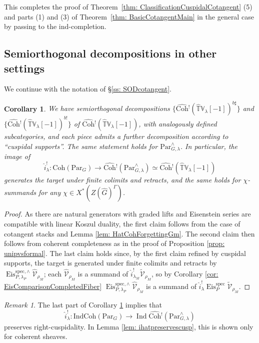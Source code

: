 \documentclass{amsart}
\newtheorem{corollary}[theorem]{Corollary}
\theoremstyle{definition}
\theoremstyle{remark}
\newtheorem{remark}[theorem]{Remark}
\numberwithin{equation}{section}
\DeclareMathOperator{\Ind}{Ind}
\newcommand{\mc}{\mathcal}
\newcommand{\spec}{\mathrm{spec}}
\newcommand{\wh}{\widehat}
\newcommand{\Par}{\mathrm{Par}}
\newcommand{\IndCoh}{\mathrm{IndCoh}}
\DeclareMathOperator{\Eis}{\mathrm{Eis}}
\newcommand{\Coh}{\mathrm{Coh}}
\newcommand{\V}{\mathbb{V}}
\newcommand{\T}{\mathbb{T}}
\begin{document}
This completes the proof of Theorem~\ref{thm: ClassificationCuspidalCotangent} (5) and parts (1) and (3) of Theorem~\ref{thm: BasicCotangentMain} in the general case by passing to the ind-completion.

\subsection{Semiorthogonal decompositions in other settings}

We continue with the notation of \S\ref{ss: SODcotangent}.

\begin{corollary}\label{cor: SODhatCoh}
We have semiorthogonal decompositions $\{\wh{\Coh}{}^!(\wh{\T}\V_{\lambda}[-1])^{b\sharp}\}$ and $\{\wh{\Coh}{}^!(\wh{\T}\V_{\lambda}[-1])^{b!}\}$ of $\wh{\Coh}{}^!(\wh{\T}\V_{\lambda}[-1])$, with analogously defined subcategories, and each piece admits a further decomposition according to ``cuspidal supports''. The same statement holds for $\Par_{G,\lambda}^{\wedge}$. In particular, the image of 
\[
\wh{i}_\lambda^!\colon \Coh(\Par_G) \to \wh{\Coh}{}^!(\Par_{G,\lambda}^\wedge) \simeq \wh{\Coh}{}^!(\wh{\T}\V_{\lambda}[-1])
\]
generates the target under finite colimits and retracts, and the same holds for $\chi$-summands for any $\chi \in X^*(Z(\wh G)^{\Gamma})$. 
\end{corollary}

\begin{proof}
As there are natural generators with graded lifts and Eisenstein series are compatible with linear Koszul duality, the first claim follows from the case of cotangent stacks and Lemma \ref{lem: HatCohForgettingGm}. The second claim then follows from coherent completeness as in the proof of Proposition \ref{prop: unipvsformal}. The last claim holds since, by the first claim refined by cuspidal supports, the target is generated under finite colimits and retracts by $\Eis^{\spec, \wedge}_{P,\lambda_P}\wh{\mc V}_{\rho_M}$; each $\wh{\mc V}_{\rho_M}$ is a summand of $\wh{i}^!_{\lambda_M}\widetilde{\mc V}_{\rho_M}$, so by Corollary \ref{cor: EisComparisonCompletedFiber} $\Eis^{\spec, \wedge}_{P,\lambda_P}\wh{\mc V}_{\rho_M}$ is a summand of $\wh{i}^!_\lambda \Eis^\spec_P \widetilde{\mc V}_{\rho_M}$. 
\end{proof}

\begin{remark}\label{rem: ihatpreservescuspIndCoh}
The last part of Corollary \ref{cor: SODhatCoh} implies that
\[
\wh{i}^!_\lambda\colon \IndCoh(\Par_G)\to \Ind\wh{\Coh}{}^!(\Par^\wedge_{G,\lambda})
\]
preserves right-cuspidality. In Lemma \ref{lem: ihatpreservescusp}, this is shown only for coherent sheaves. 
\end{remark}
\end{document}
